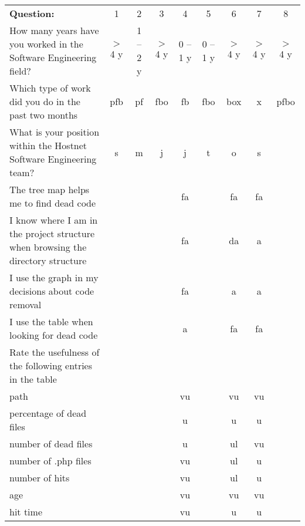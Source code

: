 \begin{sidewaystable}
\centering
\begin{tabular}{p{9cm}cccccccc}
\scriptsize
\textbf{Question:} &1&2&3&4&5&6&7&8 \\
\cmidrule(r){1-1} 
\cmidrule(lr){2-2} 
\cmidrule(lr){3-3}
\cmidrule(lr){4-4}
\cmidrule(lr){5-5}
\cmidrule(lr){6-6} 
\cmidrule(lr){7-7} 
\cmidrule(lr){6-8} 
\cmidrule(lr){9-9} 

How many years have you worked in the Software Engineering field? 
& $>$ 4 y
& 1 -- 2 y
& $>$ 4 y
& 0 -- 1 y
& 0 -- 1 y
& $>$ 4 y
& $>$ 4 y
& $>$ 4 y
\\
Which type of work did you do in the past two months
& pfb
& pf
& fbo
& fb
& fbo
& box
& x
& pfbo
\\
What is your position within the Hostnet Software Engineering team?
& s
& m
& j
& j
& t
& o
& s



\\ The tree map helps me to find dead code                                           & & & & fa & & fa & fa
\\ I know where I am in the project structure when browsing the directory structure  & & & & fa & & da &  a
\\ I use the graph in my decisions about code removal                                & & & & fa & &  a &  a
\\ I use the table when looking for dead code                                        & & & &  a & & fa & fa
\\ Rate the usefulness of the following entries in the table                         
\\\hspace{2em} path                     & & & & vu & & vu & vu 
\\\hspace{2em} percentage of dead files & & & &  u & &  u &  u
\\\hspace{2em} number of dead files     & & & &  u & & ul & vu
\\\hspace{2em} number of .php files     & & & & vu & & ul &  u
\\\hspace{2em} number of hits           & & & & vu & & ul &  u
\\\hspace{2em} age                      & & & & vu & & vu & vu
\\\hspace{2em} hit time                 & & & & vu & &  u &  u



\end{tabular}
\end{sidewaystable}
